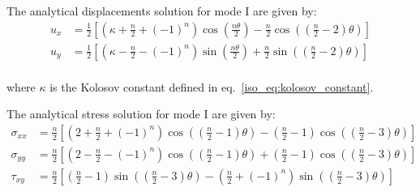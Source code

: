 The analytical displacements solution for mode \RN{1} are given by:
    \begin{subequations}
        \begin{align}
            u_x &= \frac{1}{2}\left[
                \left(
                    \kappa + \frac{n}{2} + (-1)^n
                \right) \cos \left(
                    \frac{n\theta}{2}
                \right) -
                \frac{n}{2} \cos \left(
                    \left(
                        \frac{n}{2} -2
                    \right) \theta
                \right)
            \right]\\
            u_y &= \frac{1}{2}\left[
                \left(
                    \kappa - \frac{n}{2} - (-1)^n
                \right) \sin \left(
                    \frac{n\theta}{2}
                \right) +
                \frac{n}{2} \sin \left(
                    \left(
                        \frac{n}{2} -2
                    \right) \theta
                \right)
            \right]\\
        \end{align}
    \end{subequations}

where $\kappa$ is the Kolosov constant defined in eq.~\ref{iso_eq:kolosov_constant}.

The analytical stress solution for mode \RN{1} are given by:
    \begin{subequations}
        \begin{align}
            \sigma_{xx} &= \frac{n}{2}\left[
                \left(
                    2 + \frac{n}{2} + (-1)^n
                \right) \cos \left(
                    \left(
                        \frac{n}{2} - 1
                    \right)\theta
                \right) - \left(
                    \frac{n}{2} - 1
                \right)
                \cos \left(
                    \left(
                        \frac{n}{2} -3
                    \right) \theta
                \right)
            \right]\\
            \sigma_{yy} &= \frac{n}{2}\left[
                \left(
                    2 - \frac{n}{2} - (-1)^n
                \right) \cos \left(
                    \left(
                        \frac{n}{2} - 1
                    \right)\theta
                \right) + \left(
                    \frac{n}{2} - 1
                \right)
                \cos \left(
                    \left(
                        \frac{n}{2} -3
                    \right) \theta
                \right)
            \right]\\
            \tau_{xy} &= \frac{n}{2}\left[
                \left(
                    \frac{n}{2} - 1
                \right) \sin \left(
                    \left(
                        \frac{n}{2} - 3
                    \right)\theta
                \right) - \left(
                    \frac{n}{2} + (-1)^n
                \right)
                \sin \left(
                    \left(
                        \frac{n}{2} - 3
                    \right) \theta
                \right)
            \right]
        \end{align}
    \end{subequations}

